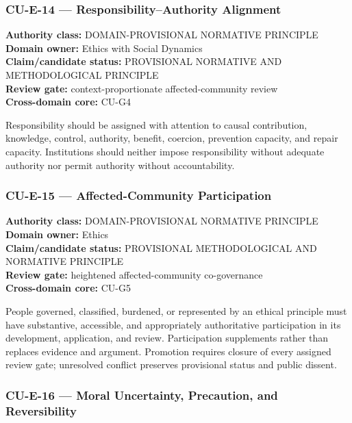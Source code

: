 \documentclass[
  11pt,
]{article}
\begin{document}
\subsubsection{CU-E-14 --- Responsibility--Authority
Alignment}\label{cu-e-14-responsibilityauthority-alignment}

\textbf{Authority class:} DOMAIN-PROVISIONAL NORMATIVE PRINCIPLE\\
\textbf{Domain owner:} Ethics with Social Dynamics\\
\textbf{Claim/candidate status:} PROVISIONAL NORMATIVE AND
METHODOLOGICAL PRINCIPLE\\
\textbf{Review gate:} context-proportionate affected-community review\\
\textbf{Cross-domain core:} CU-G4

Responsibility should be assigned with attention to causal contribution,
knowledge, control, authority, benefit, coercion, prevention capacity,
and repair capacity. Institutions should neither impose responsibility
without adequate authority nor permit authority without accountability.

\subsubsection{CU-E-15 --- Affected-Community
Participation}\label{cu-e-15-affected-community-participation}

\textbf{Authority class:} DOMAIN-PROVISIONAL NORMATIVE PRINCIPLE\\
\textbf{Domain owner:} Ethics\\
\textbf{Claim/candidate status:} PROVISIONAL METHODOLOGICAL AND
NORMATIVE PRINCIPLE\\
\textbf{Review gate:} heightened affected-community co-governance\\
\textbf{Cross-domain core:} CU-G5

People governed, classified, burdened, or represented by an ethical
principle must have substantive, accessible, and appropriately
authoritative participation in its development, application, and review.
Participation supplements rather than replaces evidence and argument.
Promotion requires closure of every assigned review gate; unresolved
conflict preserves provisional status and public dissent.

\subsubsection{CU-E-16 --- Moral Uncertainty, Precaution, and
Reversibility}\label{cu-e-16-moral-uncertainty-precaution-and-reversibility}
\end{document}
